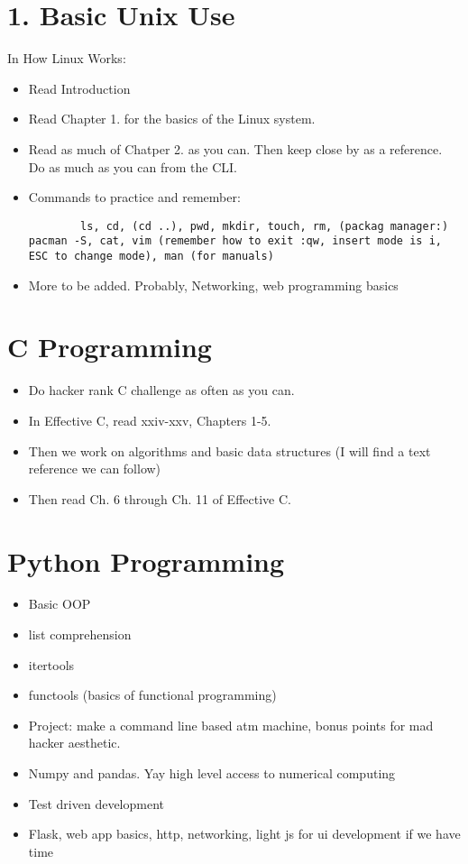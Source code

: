 \documentclass[a4paper, 12pt]{report}
\begin{document}
    \romantableofcontents

\chapter{1. Basic Unix Use}
    In How Linux Works:
        \begin{itemize}
                \item Read Introduction
                \item Read Chapter 1. for the basics of the Linux system.
                \item Read as much of Chatper 2. as you can. Then keep close by as a reference. Do as much as you can from the CLI.

                \item Commands to practice and remember:
                
                \begin{lstlisting} 
        ls, cd, (cd ..), pwd, mkdir, touch, rm, (packag manager:) pacman -S, cat, vim (remember how to exit :qw, insert mode is i, ESC to change mode), man (for manuals)\end{lstlisting}
        \item More to be added. Probably, Networking, web programming basics
        \end{itemize}
\chapter{C Programming}
\begin{itemize}
        \item Do hacker rank C challenge as often as you can.
        \item In Effective C, read xxiv-xxv, Chapters 1-5.
        \item Then we work on algorithms and basic data structures (I will find a text reference we can follow)
        \item Then read Ch. 6 through Ch. 11 of Effective C. 
\end{itemize}
\chapter{Python Programming}
\begin{itemize}
        \item Basic OOP
        \item list comprehension
        \item itertools
        \item functools (basics of functional programming)
        \item Project: make a command line based atm machine, bonus points for mad hacker aesthetic.
        \item Numpy and pandas. Yay high level access to numerical computing
        \item Test driven development
        \item Flask, web app basics, http, networking, light js for ui development if we have time
        \end{itemize}
\end{document}
